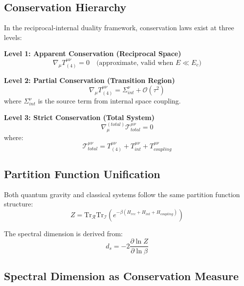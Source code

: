 \documentclass[12pt,a4paper]{article}
\begin{document}
\subsection{Conservation Hierarchy}

In the reciprocal-internal duality framework, conservation laws exist at three levels:

\textbf{Level 1: Apparent Conservation (Reciprocal Space)}
\begin{equation}
    \nabla_\mu T^{\mu\nu}_{(4)} = 0 \quad \text{(approximate, valid when $E \ll E_c$)}
\end{equation}

\textbf{Level 2: Partial Conservation (Transition Region)}
\begin{equation}
    \nabla_\mu T^{\mu\nu}_{(4)} = \Sigma^\nu_{int} + \mathcal{O}(\tau^2)
\end{equation}
where $\Sigma^\nu_{int}$ is the source term from internal space coupling.

\textbf{Level 3: Strict Conservation (Total System)}
\begin{equation}
    \nabla^{(total)}_\mu \mathcal{T}^{\mu\nu}_{total} = 0
\end{equation}
where:
\begin{equation}
    \mathcal{T}^{\mu\nu}_{total} = T^{\mu\nu}_{(4)} + T^{\mu\nu}_{int} + T^{\mu\nu}_{coupling}
\end{equation}

\subsection{Partition Function Unification}

Both quantum gravity and classical systems follow the same partition function structure:
\begin{equation}
    Z = \text{Tr}_{\mathcal{R}} \text{Tr}_{\mathcal{I}} \left(e^{-\beta (H_{rec} + H_{int} + H_{coupling})}\right)
\end{equation}

The spectral dimension is derived from:
\begin{equation}
    d_s = -2 \frac{\partial \ln Z}{\partial \ln \beta}
\end{equation}

\subsection{Spectral Dimension as Conservation Measure}
\end{document}

